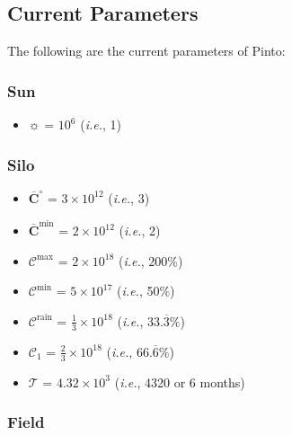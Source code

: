 \documentclass[class=article, crop=false]{standalone}
\begin{document}

\subsection{Current Parameters}

The following are the current parameters of Pinto:


\subsubsection{Sun}

\begin{itemize}[topsep=0pt, itemsep=3pt,leftmargin=16pt]
    \item $\sun$ = $10^{6}$ (\textit{i.e.}, 1)
\end{itemize}


\subsubsection{Silo}

\begin{itemize}[topsep=0pt, itemsep=3pt,leftmargin=16pt]
    \item $\overline{\mathbf{C}}^{\circ}$ = $3 \times 10^{12}$ (\textit{i.e.}, 3)
    \item $\overline{\mathbf{C}}^{\text{min}}$ = $2 \times 10^{12}$ (\textit{i.e.}, 2)
    \item $\mathscr{C}^{\text{max}}$ = $2 \times 10^{18}$ (\textit{i.e.}, 200\%)
    \item $\mathscr{C}^{\text{min}}$ = $5 \times 10^{17}$ (\textit{i.e.}, 50\%)
    \item $\mathscr{C}^{\text{rain}}$ = $\frac{1}{3} \times 10^{18}$ (\textit{i.e.}, 33.$\overline{3}\%$)
    \item $\mathscr{C}_{1}$ = $\frac{2}{3} \times 10^{18}$ (\textit{i.e.}, 66.$\overline{6}\%$)
    \item $\mathscr{T}$ = $4.32 \times 10^{3}$ (\textit{i.e.}, 4320  or 6 months)
\end{itemize}


\subsubsection{Field}
\end{document}
